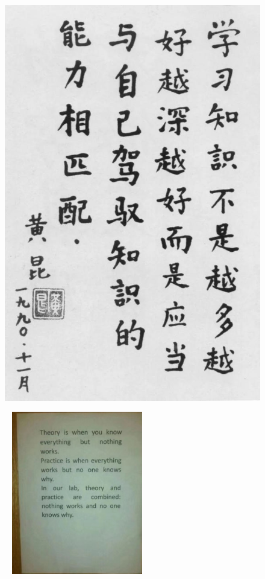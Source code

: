 \frame
{
	\frametitle{}
\begin{figure}[h!]
\centering
\vspace{-5.5pt}
\includegraphics[height=0.65\textwidth]{Figures/Quote-Huang_Kun.jpg}
\caption{\fontsize{6.2pt}{5.2pt}\selectfont{黄~~昆~教授的治学名言}}
\label{Quote-Huang_Kun}
\end{figure}
}

\frame
{
\begin{figure}[h!]
\vskip -5pt
\centering
\includegraphics[height=2.8in,width=2.5in,viewport=110 225 505 660,clip]{Figures/Theory_Practice.jpg}
\label{Theory_Practice}
\end{figure}
}

